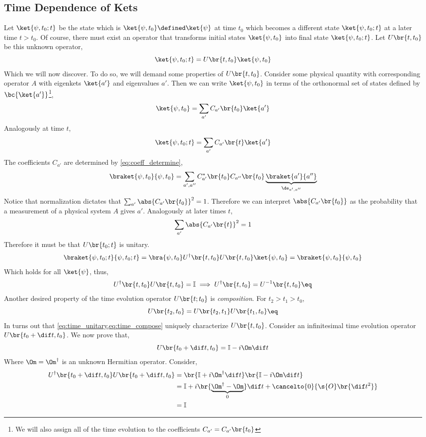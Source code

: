 \documentclass{article}
\begin{document}
\subsection{Time Dependence of Kets}
Let $\ket{\psi, t_0; t}$ be the state which is $\ket{\psi, t_0} \defined \ket{\psi}$ at time $t_0$ which becomes a different state $\ket{\psi, t_0; t}$ at a later time $t > t_0$. Of course, there must exist an operator that transforms initial states $\ket{\psi, t_0}$ into final state $\ket{\psi, t_0; t}$. Let $U\br{t, t_0}$ be this unknown operator,
\[ \ket{\psi, t_0; t} = U\br{t, t_0} \ket{\psi, t_0} \]
Which we will now discover. To do so, we will demand some properties of $U\br{t, t_0}$. Consider some physical quantity with corresponding operator $A$ with eigenkets $\ket{a'}$ and eigenvalues $a'$. Then we can write $\ket{\psi, t_0}$ in terms of the orthonormal set of states defined by $\bc{\ket{a'}}$\footnote{We will also assign all of the time evolution to the coefficients $C_{a'} = C_{a'}\br{t_0}$},
\[ \ket{\psi, t_0} = \sum_{a'} C_{a'}\br{t_0} \ket{a'} \]
Analogously at time $t$,
\[ \ket{\psi, t_0; t} = \sum_{a'} C_{a'}\br{t} \ket{a'} \]
The coefficients $C_{a'}$ are determined by \cref{eq:coeff_determine},
\[ \braket{\psi, t_0}{\psi, t_0} = \sum_{a', a''} C^{*}_{a'}\br{t_0}C_{a''}\br{t_0} \underbrace{\braket{a'}{a''}}_{\de_{a', a''}} \]
Notice that normalization dictates that $\sum_{a'} \abs{C_{a'}\br{t_0}}^2 = 1$. Therefore we can interpret $\abs{C_{a'}\br{t_0}}$ as the probability that a measurement of a physical system $A$ gives $a'$. Analogously at later times $t$,
\[ \sum_{a'}\abs{C_{a'}\br{t}}^2 = 1 \]
Therefore it must be that $U\br{t_0; t}$ is unitary.
\[ \braket{\psi, t_0; t}{\psi, t_0; t} = \bra{\psi, t_0} U^{\dagger}\br{t,t_0}U\br{t,t_0}\ket{\psi, t_0} = \braket{\psi, t_0}{\psi, t_0}\]
Which holds for all $\ket{\psi}$, thus,
\[ U^{\dagger}\br{t,t_0}U\br{t,t_0} = \mathbb{I} \implies U^{\dagger}\br{t,t_0} = U^{-1}\br{t,t_0} \eq \label{eq:time_unitary} \]
Another desired property of the time evolution operator $U\br{t; t_0}$ is \textit{composition}. For $t_2 > t_1 > t_0$,
\[ U\br{t_2, t_0} = U\br{t_2, t_1} U\br{t_1, t_0} \eq \label{eq:time_compose}\]
In turns out that \cref{eq:time_unitary,eq:time_compose} uniquely characterize $U\br{t,t_0}$. Consider an infinitesimal time evolution operator $U\br{t_0+\dif t, t_0}$. We now prove that,
\[ U\br{t_0+\dif t, t_0} = \mathbb{I} - i \Om \dif t \]
Where $\Om = \Om^{\dagger}$ is an unknown Hermitian operator. Consider,
\begin{align*}
U^{\dagger}\br{t_0+\dif t, t_0}U\br{t_0+\dif t, t_0} &= \br{\mathbb{I} + i \Om^{\dagger} \dif t}\br{\mathbb{I} - i \Om \dif t} \\
&= \mathbb{I} + i \br{\underbrace{\Om^{\dagger} - \Om}_0} \dif t + \cancelto{0}{\s{O}\br{\dif t^2}} \\
&= \mathbb{I}
\end{align*}
\end{document}
